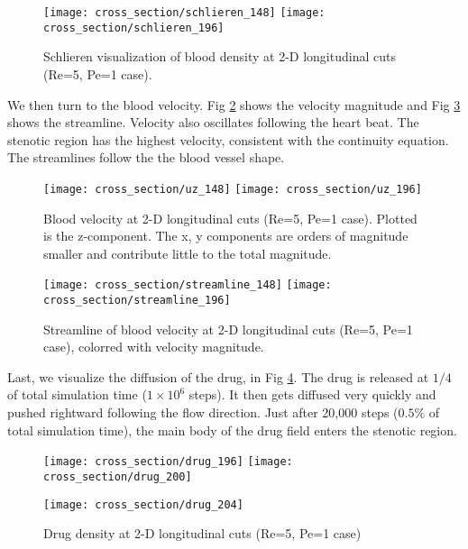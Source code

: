 \begin{figure}[H]
\texttt{[image: cross\_section/schlieren\_148]}
\texttt{[image: cross\_section/schlieren\_196]}
\centering
\caption{Schlieren visualization of blood density at 2-D longitudinal cuts (Re=5, Pe=1 case).}
\label{fig:sch}
\end{figure}

We then turn to the blood velocity. Fig \ref{fig:uz} shows the velocity magnitude and Fig \ref{fig:streamline} shows the streamline. Velocity also oscillates following the heart beat.
The stenotic region has the highest velocity, consistent with the continuity equation. The streamlines follow the the blood vessel shape.

\begin{figure}[H]
\texttt{[image: cross\_section/uz\_148]}
\texttt{[image: cross\_section/uz\_196]}
\centering
\caption{Blood velocity at 2-D longitudinal cuts (Re=5, Pe=1 case). Plotted is the z-component. The x, y components are orders of magnitude smaller and contribute little to the total magnitude.}
\label{fig:uz}
\end{figure}


\begin{figure}[H]
\texttt{[image: cross\_section/streamline\_148]}
\texttt{[image: cross\_section/streamline\_196]}
\centering
\caption{Streamline of blood velocity at 2-D longitudinal cuts (Re=5, Pe=1 case), colorred with velocity magnitude.}
\label{fig:streamline}
\end{figure}

Last, we visualize the diffusion of the drug, in Fig \ref{fig:drug}. The drug is released at $1/4$ of total simulation time ($1 \times 10^6$ steps). It then gets diffused very quickly and pushed rightward following the flow direction. Just after 20,000 steps ($0.5\%$ of total simulation time), the main body of the drug field enters the stenotic region.

\begin{figure}[H]
\texttt{[image: cross\_section/drug\_196]}
\texttt{[image: cross\_section/drug\_200]}
\centering
{}
\end{figure}

\begin{figure}[H]\ContinuedFloat
\texttt{[image: cross\_section/drug\_204]}
\centering
\caption{Drug density at 2-D longitudinal cuts (Re=5, Pe=1 case)}
\label{fig:drug}
\end{figure}

